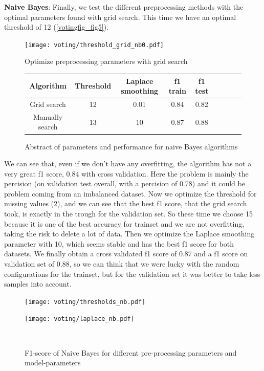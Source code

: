 \documentclass[11pt]{article}
\begin{document}
\textbf{Naive Bayes}: Finally, we test the different preprocessing methods with the optimal parameters found with grid search. This time we have an optimal threshold of 12 (\ref{votingfig_fig5}). 

\begin{figure}
\begin{minipage}[t]{0.3\textwidth}
\texttt{[image: voting/threshold\_grid\_nb0.pdf]}
\caption{Optimize preprocessing parameters with grid search}
\label{votingfig_fig5}
\end{minipage}
\begin{minipage}[t]{0.7\textwidth}
\centering
  \begin{tabular}{ | c | c | c | c | c | c | c | c | c |}
	\hline
    Algorithm & Threshold & Laplace smoothing & f1 train & f1 test \\    
    \hline
    Grid search & 12 & 0.01 & 0.84 & 0.82 \\ \hline
    Manually search & 13 & 10 & 0.87 & 0.88\\
    \hline
    \end{tabular}
    \caption{Abstract of parameters and performance for naive Bayes algorithms}
    \label{tab_voting2}
\end{minipage}
\end{figure}

We can see that, even if we don't have any overfitting, the algorithm has not a very great f1 score, 0.84 with cross validation. Here the problem is mainly the percision (on validation test overall, with a percision of 0.78) and it could be problem coming from an imbalanced dataset.
Now we optimize the threshold for missing values (\ref{votingfig_fig6}), and we can see that the best f1 score, that the grid search took, is exactly in the trough for the validation set. So these time we choose 15 because it is one of the best accuracy for trainset and we are not overfitting, taking the risk to delete a lot of data. Then we optimize the Laplace smoothing parameter with 10, which seems stable and has the best f1 score for both datasets.
We finally obtain a cross validated f1 score of 0.87 and a f1 score on validation set of 0.88, so we can think that we were lucky with the random configurations for the trainset, but for the validation set it was better to take less samples into account.

\begin{figure}
\begin{minipage}[l]{0.3\textwidth}
\texttt{[image: voting/thresholds\_nb.pdf]}
\end{minipage}
\begin{minipage}[l]{0.3\textwidth}
\texttt{[image: voting/laplace\_nb.pdf]}
\end{minipage}
\begin{minipage}[l]{0.3\textwidth}
\end{minipage}\\
   \caption{F1-score of Naive Bayes for different pre-processing parameters and model-parameters}
\label{votingfig_fig6}
\end{figure}
\end{document}
